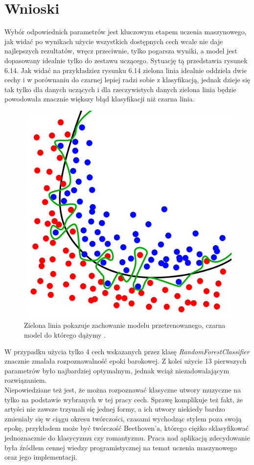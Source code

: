 \documentclass[printmode, eng]{mgr}
\newcommand\tab[1][1cm]{\hspace*{#1}}
\begin{document}
\section{Wnioski}
\tab Wybór odpowiednich parametrów jest kluczowym etapem uczenia maszynowego, jak widać po wynikach użycie wszystkich dostępnych cech wcale nie daje najlepszych rezultatów, wręcz przeciwnie, tylko pogarsza wyniki, a model jest dopasowany idealnie tylko do zestawu uczącego. Sytuację tą przedstawia rysunek 6.14. Jak widać na przykładzie\linebreak z rysunku 6.14 zielona linia idealnie oddziela dwie cechy i w porównaniu do czarnej lepiej radzi sobie z klasyfikacją, jednak dzieje się tak tylko dla danych uczących i dla rzeczywistych danych zielona linia będzie powodowała znacznie większy błąd klasyfikacji niż czarna linia.
\begin{figure}[H]
\centering
\includegraphics[scale=0.3]{overfitting.png}
\caption{Zielona linia pokazuje zachowanie modelu przetrenowanego, czarna model do którego dążymy \cite{ovrimg}. }
\end{figure}
\tab W przypadku użycia tylko 4 cech wskazanych przez klasę \textit{RandomForestClassifier} znacznie zmalała rozpoznawalność epoki barokowej. Z kolei użycie 13 pierwszych parametrów było najbardziej optymalnym, jednak wciąż niezadowalającym rozwiązaniem.\\
\tab Niepowiedziane też jest, że można rozpoznawać klasyczne utwory muzyczne na tylko na podstawie wybranych w tej pracy cech. Sprawę komplikuje też fakt, że artyści nie zawsze trzymali się jednej formy, a ich utwory niekiedy bardzo zmieniały się w ciągu okresu twórczości, czasami wychodząc stylem poza swoją epokę, przykładem może być twórczość Beethoven'a, którego ciężko sklasyfikować jednoznacznie do klasycyzmu czy romantyzmu.
\tab Praca nad aplikacją zdecydowanie była źródłem cennej wiedzy programistycznej na temat uczenia maszynowego oraz jego implementacji.
\end{document}
